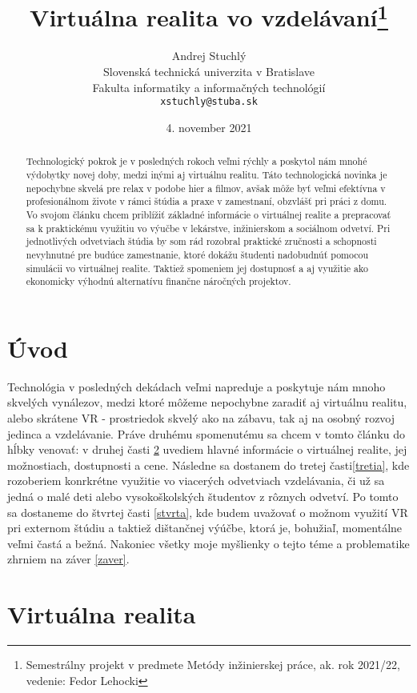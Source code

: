 \documentclass[10pt,twoside,slovak,a4paper]{article}
\title{Virtuálna realita vo vzdelávaní\thanks{Semestrálny projekt v predmete Metódy inžinierskej práce, ak. rok 2021/22, vedenie: Fedor Lehocki}}
\author{Andrej Stuchlý\\[2pt]
	{\small Slovenská technická univerzita v Bratislave}\\
	{\small Fakulta informatiky a informačných technológií}\\
	{\small \texttt{xstuchly@stuba.sk}}
	}
\date{\small 4. november 2021}
\begin{document}
\maketitle

\begin{abstract}
Technologický pokrok je v posledných rokoch veľmi rýchly a poskytol nám mnohé výdobytky novej doby, medzi inými aj virtuálnu realitu. Táto technologická novinka je nepochybne skvelá pre relax v podobe hier a filmov, avšak môže byť veľmi efektívna v profesionálnom živote v rámci štúdia a praxe v zamestnaní, obzvlášť pri práci z domu. Vo svojom článku chcem priblížiť základné informácie o virtuálnej realite a prepracovať sa k  praktickému využitiu vo výučbe v lekárstve, inžinierskom a sociálnom odvetví. Pri jednotlivých odvetviach štúdia by som rád rozobral praktické zručnosti a schopnosti nevyhnutné pre budúce zamestnanie, ktoré dokážu študenti nadobudnúť pomocou simulácii vo virtuálnej realite. Taktiež spomeniem jej dostupnosť a aj využitie ako ekonomicky výhodnú alternatívu finančne náročných projektov. 
\end{abstract}



\section{Úvod}

Technológia v posledných dekádach veľmi napreduje a poskytuje nám mnoho skvelých vynálezov, medzi ktoré môžeme nepochybne zaradiť aj virtuálnu realitu, alebo skrátene VR - prostriedok skvelý ako na zábavu, tak aj na osobný rozvoj jedinca a vzdelávanie. Práve druhému spomenutému sa chcem v tomto článku do hĺbky venovať: v druhej časti \ref{druha} uvediem hlavné informácie o virtuálnej realite, jej možnostiach, dostupnosti a cene. Následne sa dostanem do tretej časti\ref{tretia}, kde rozoberiem konrkrétne využitie vo viacerých odvetviach vzdelávania, či už sa jedná o malé deti alebo vysokoškolských študentov z rôznych odvetví. Po tomto sa dostaneme do štvrtej časti \ref{stvrta}, kde budem uvažovať o možnom využití VR pri externom štúdiu a taktiež dištančnej výúčbe, ktorá je, bohužiaľ, momentálne veľmi častá a bežná. Nakoniec všetky moje myšlienky o tejto téme a problematike zhrniem na záver \ref{zaver}.



\section{Virtuálna realita} \label{druha}
\end{document}
